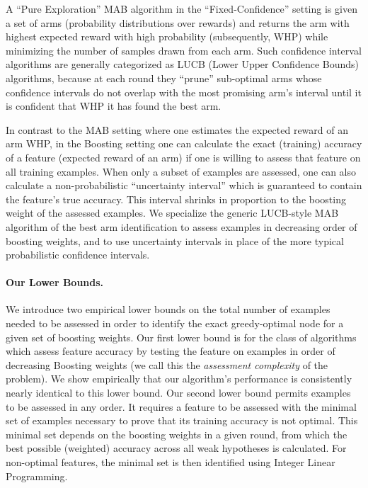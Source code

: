 A ``Pure Exploration'' MAB algorithm in the ``Fixed-Confidence'' setting
\citep{DBLP:conf/icml/KalyanakrishnanTAS12,NIPS2012_4640,COLT13}
is given a set of arms (probability distributions over rewards)
and returns the arm with highest expected reward with high probability
(subsequently, WHP)
while minimizing the number of samples drawn from each arm.
Such confidence interval algorithms are generally categorized as
LUCB (Lower Upper Confidence Bounds) algorithms, because at each round
they ``prune'' sub-optimal arms whose confidence intervals do not overlap
with the most promising arm's interval until it is confident that WHP
it has found the best arm. 

In contrast to the MAB setting where one estimates the expected reward
of an arm WHP,
in the Boosting setting one can calculate the exact (training) accuracy
of a feature (expected reward of an arm) if one is willing to assess that
feature on all training examples.
When only a subset of examples are assessed, one can also calculate a
non-probabilistic ``uncertainty interval'' which is guaranteed to contain
the feature's true accuracy. This interval shrinks in proportion to the boosting weight of the assessed examples. We specialize the generic LUCB-style MAB algorithm of the best arm identification to assess examples in decreasing order of boosting weights, and to use uncertainty intervals in place of the more typical probabilistic confidence intervals.

\paragraph{Our Lower Bounds.}
We introduce two empirical lower bounds on the total number of examples needed
to be assessed in order to identify the exact greedy-optimal node for a given
set of boosting weights.
Our first lower bound is for the class of algorithms which assess feature
accuracy by testing the feature on examples in order of decreasing Boosting
weights (we call this the \emph{assessment complexity} of the problem).
We show empirically that our algorithm's performance is consistently nearly
identical to this lower bound.
%
Our second lower bound permits examples to be assessed in any order.
It requires a feature to be assessed with the minimal set of examples
necessary to prove that its training accuracy is not optimal.
This minimal set depends on the boosting weights in a given round,
from which the best possible (weighted) accuracy across all weak hypotheses
is calculated.
For non-optimal features, the minimal set is then identified using
Integer Linear Programming.


